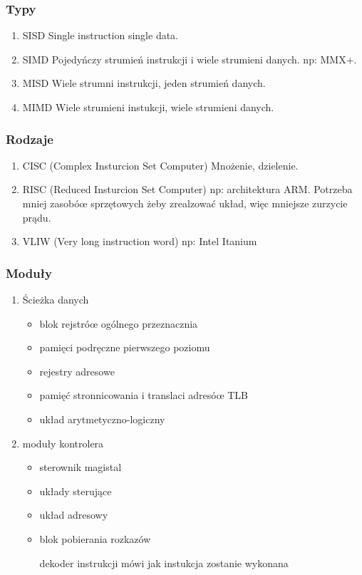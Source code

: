 \documentclass[11pt]{article}
\begin{document}
\subsubsection{Typy}
\label{sec:orgdf2633a}
\begin{enumerate}
\item SISD
\label{sec:org3f52880}
Single instruction single data.
\item SIMD
\label{sec:org407569c}
Pojedyńczy strumień instrukcji i wiele strumieni danych.
np: MMX+.
\item MISD
\label{sec:org654e264}
Wiele strumni instrukcji, jeden strumień danych.
\item MIMD
\label{sec:orgb266fd8}
Wiele strumieni instukcji, wiele strumieni danych.
\end{enumerate}
\subsubsection{Rodzaje}
\label{sec:org1621382}
\begin{enumerate}
\item CISC (Complex Insturcion Set Computer)
\label{sec:orgc1705bc}
Mnożenie, dzielenie.
\item RISC (Reduced Insturcion Set Computer)
\label{sec:orgb6ab160}
np: architektura ARM.
Potrzeba mniej zasobóœ sprzętowych żeby zrealzować układ, więc mniejsze zurzycie prądu.
\item VLIW (Very long instruction word)
\label{sec:org15afcb5}
np: Intel Itanium
\end{enumerate}
\subsubsection{Moduły}
\label{sec:org1cb3ba7}
\begin{enumerate}
\item Ścieżka danych
\label{sec:org2eea4af}
\begin{itemize}
\item blok rejstróœ ogólnego przeznacznia
\item pamięci podręczne pierwszego poziomu
\item rejestry adresowe
\item pamięć stronnicowania i translaci adresóœ TLB
\item układ arytmetyczno-logiczny
\end{itemize}
\item moduły kontrolera
\label{sec:orgcfb1a41}
\begin{itemize}
\item sterownik magistal
\item układy sterujące
\item układ adresowy
\item blok pobierania rozkazów
\item[{dekoder instrukcji}] mówi jak instukcja zostanie wykonana
\end{itemize}
\end{enumerate}
\end{document}
